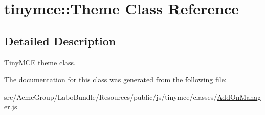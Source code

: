 \hypertarget{classtinymce_1_1_theme}{\section{tinymce\+:\+:Theme Class Reference}
\label{classtinymce_1_1_theme}
}


\subsection{Detailed Description}
Tiny\+M\+C\+E theme class. 

The documentation for this class was generated from the following file\+:\begin{DoxyCompactItemize}
\item 
src/\+Acme\+Group/\+Labo\+Bundle/\+Resources/public/js/tinymce/classes/\hyperlink{_add_on_manager_8js}{Add\+On\+Manager.\+js}\end{DoxyCompactItemize}
